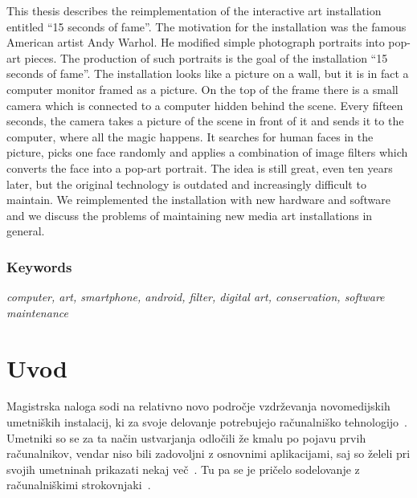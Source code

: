 \documentclass[a4paper, 12pt]{book}
\begin{document}
This thesis describes the reimplementation of the interactive art installation
entitled ``15 seconds of fame''. The motivation for the installation was the
famous American artist Andy Warhol. He modified simple photograph portraits
into pop-art pieces. The production of such portraits is the goal of the
installation ``15 seconds of fame''. The installation looks like a picture on
a wall, but it is in fact a computer monitor framed as a picture. On the top
of the frame there is a small camera which is connected to a computer hidden
behind the scene. Every fifteen seconds, the camera takes a picture of the
scene in front of it and sends it to the computer, where all the magic happens. It
searches for human faces in the picture, picks one face randomly and applies a
combination of image filters which converts the face into a pop-art
portrait. The idea is still great, even ten years later, but the original
technology is outdated and increasingly difficult to maintain. We reimplemented
the installation with new hardware and software and we discuss the problems of
maintaining new media art installations in general.

\subsection*{Keywords}
\textit{computer, art, smartphone, android, filter, digital art, conservation, software maintenance}
\clearemptydoublepage



\mainmatter
\pagestyle{mainmatter}



\chapter{Uvod}
\newcommand{\refPoglavju}[1]{\ref{#1}.~poglavju}

Magistrska naloga sodi na relativno novo področje vzdrževanja novomedijskih
umetniških instalacij, ki za svoje delovanje potrebujejo računalniško
tehnologijo~\cite{firstdecade}. Umetniki so se za ta način ustvarjanja
odločili že kmalu po pojavu prvih računalnikov, vendar niso bili zadovoljni z
osnovnimi aplikacijami, saj so želeli pri svojih umetninah prikazati nekaj
več~\cite{miller2}. Tu pa se je pričelo sodelovanje z računalniškimi
strokovnjaki~\cite{miller1}.
\end{document}
